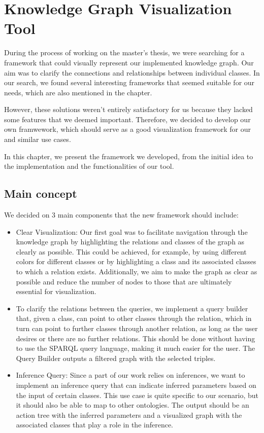 \chapter*{Knowledge Graph Visualization Tool}
During the process of working on the master's thesis, we were searching for a framework that could visually represent our implemented knowledge graph. Our aim was to clarify the connections and relationships between individual classes. In our search, we found several interesting frameworks that seemed suitable for our needs, which are also mentioned in the  chapter.

However, these solutions weren't entirely satisfactory for us because they lacked some features that we deemed important. Therefore, we decided to develop our own framwework, which should serve as a good visualization framework for our and similar use cases.

In this chapter, we present the framework we developed, from the initial idea to the implementation and the functionalities of our tool.

\section{Main concept}
\label{sec:MainConceps}

We decided on 3 main components that the new framework should include:
\begin{itemize}
    \item Clear Visualization: Our first goal was to facilitate navigation through the knowledge graph by highlighting the relations and classes of the graph as clearly as possible. This could be achieved, for example, by using different colors for different classes or by highlighting a class and its associated classes to which a relation exists. Additionally, we aim to make the graph as clear as possible and reduce the number of nodes to those that are ultimately essential for visualization.
    \item To clarify the relations between the queries, we implement a query builder that, given a class, can point to other classes through the relation, which in turn can point to further classes through another relation, as long as the user desires or there are no further relations. This should be done without having to use the SPARQL query language, making it much easier for the user. The Query Builder outputs a filtered graph with the selected triples.
    \item Inference Query: Since a part of our work relies on inferences, we want to implement an inference query that can indicate inferred parameters based on the input of certain classes. This use case is quite specific to our scenario, but it should also be able to map to other ontologies. The output should be an action tree with the inferred parameters and a visualized graph with the associated classes that play a role in the inference.
\end{itemize}

